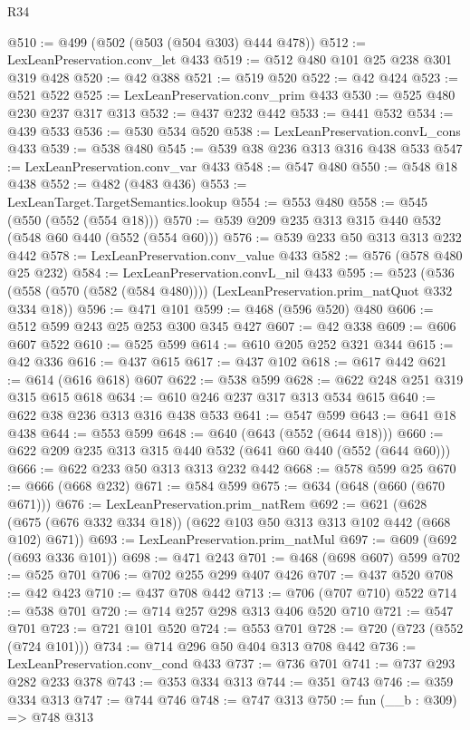 \begin{lexlean}{R34}
\begin{coremodule}
@510 := @499 (@502 (@503 (@504 @303) @444 @478))
@512 := LexLeanPreservation.conv_let @433
@519 := @512 @480 @101 @25 @238 @301 @319 @428
@520 := @42 @388
@521 := @519 @520
@522 := @42 @424
@523 := @521 @522
@525 := LexLeanPreservation.conv_prim @433
@530 := @525 @480 @230 @237 @317 @313
@532 := @437 @232 @442
@533 := @441 @532
@534 := @439 @533
@536 := @530 @534 @520
@538 := LexLeanPreservation.convL_cons @433
@539 := @538 @480
@545 := @539 @38 @236 @313 @316 @438 @533
@547 := LexLeanPreservation.conv_var @433
@548 := @547 @480
@550 := @548 @18 @438
@552 := @482 (@483 @436)
@553 := LexLeanTarget.TargetSemantics.lookup
@554 := @553 @480
@558 := @545 (@550 (@552 (@554 @18)))
@570 := @539 @209 @235 @313 @315 @440 @532 (@548 @60 @440 (@552 (@554 @60)))
@576 := @539 @233 @50 @313 @313 @232 @442
@578 := LexLeanPreservation.conv_value @433
@582 := @576 (@578 @480 @25 @232)
@584 := LexLeanPreservation.convL_nil @433
@595 := @523
    (@536 (@558 (@570 (@582 (@584 @480)))) (LexLeanPreservation.prim_natQuot @332 @334 @18))
@596 := @471 @101
@599 := @468 (@596 @520) @480
@606 := @512 @599 @243 @25 @253 @300 @345 @427
@607 := @42 @338
@609 := @606 @607 @522
@610 := @525 @599
@614 := @610 @205 @252 @321 @344
@615 := @42 @336
@616 := @437 @615
@617 := @437 @102
@618 := @617 @442
@621 := @614 (@616 @618) @607
@622 := @538 @599
@628 := @622 @248 @251 @319 @315 @615 @618
@634 := @610 @246 @237 @317 @313 @534 @615
@640 := @622 @38 @236 @313 @316 @438 @533
@641 := @547 @599
@643 := @641 @18 @438
@644 := @553 @599
@648 := @640 (@643 (@552 (@644 @18)))
@660 := @622 @209 @235 @313 @315 @440 @532 (@641 @60 @440 (@552 (@644 @60)))
@666 := @622 @233 @50 @313 @313 @232 @442
@668 := @578 @599 @25
@670 := @666 (@668 @232)
@671 := @584 @599
@675 := @634 (@648 (@660 (@670 @671)))
@676 := LexLeanPreservation.prim_natRem
@692 := @621 (@628 (@675 (@676 @332 @334 @18)) (@622 @103 @50 @313 @313 @102 @442 (@668 @102) @671))
@693 := LexLeanPreservation.prim_natMul
@697 := @609 (@692 (@693 @336 @101))
@698 := @471 @243
@701 := @468 (@698 @607) @599
@702 := @525 @701
@706 := @702 @255 @299 @407 @426
@707 := @437 @520
@708 := @42 @423
@710 := @437 @708 @442
@713 := @706 (@707 @710) @522
@714 := @538 @701
@720 := @714 @257 @298 @313 @406 @520 @710
@721 := @547 @701
@723 := @721 @101 @520
@724 := @553 @701
@728 := @720 (@723 (@552 (@724 @101)))
@734 := @714 @296 @50 @404 @313 @708 @442
@736 := LexLeanPreservation.conv_cond @433
@737 := @736 @701
@741 := @737 @293 @282 @233 @378
@743 := @353 @334 @313
@744 := @351 @743
@746 := @359 @334 @313
@747 := @744 @746
@748 := @747 @313
@750 := fun (__b : @309) => @748 @313

\end{coremodule}
\end{lexlean}
